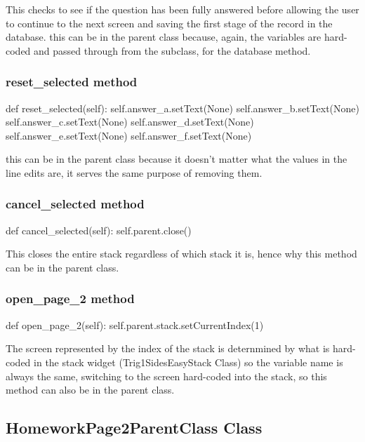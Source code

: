 This checks to see if the question has been fully answered before allowing the user to continue to the next screen and saving the first stage of the record in the database. this can be in the parent class because, again, the variables are hard-coded and passed through from the subclass, for the database method.

\subsubsection{reset\_selected method}

\begin{python}
def reset_selected(self):
        self.answer_a.setText(None)
        self.answer_b.setText(None)
        self.answer_c.setText(None)
        self.answer_d.setText(None)
        self.answer_e.setText(None)
        self.answer_f.setText(None)
\end{python}

this can be in the parent class because it doesn't matter what the values in the line edits are, it serves the same purpose of removing them.

\subsubsection{cancel\_selected method}

\begin{python}
def cancel_selected(self):
        self.parent.close()
\end{python}

This closes the entire stack regardless of which stack it is, hence why this method can be in the parent class.

\subsubsection{open\_page\_2 method}

\begin{python}
def open_page_2(self):
        self.parent.stack.setCurrentIndex(1)
\end{python}

The screen represented by the index of the stack is deternmined by what is hard-coded in the stack widget (Trig1SidesEasyStack Class) so the variable name is always the same, switching to the screen hard-coded into the stack, so this method can also be in the parent class.

\subsection{HomeworkPage2ParentClass Class}

